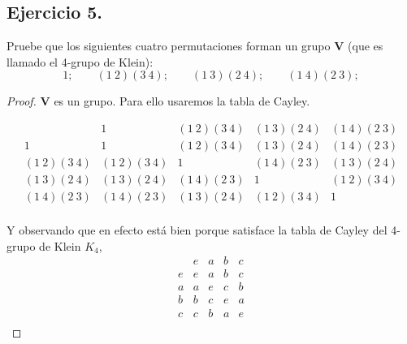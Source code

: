 \documentclass[11pt,letterpaper]{article}
\begin{document}
\subsection*{Ejercicio 5.}
Pruebe que los siguientes cuatro permutaciones forman un grupo $\mathbf{V}$ (que es llamado el 4-grupo de Klein):
\[
    1; \qquad (1\ 2)(3\ 4); \qquad (1\ 3)(2\ 4); \qquad (1\ 4)(2\ 3);
\]
\begin{proof}
    $\mathbf{V}$ es un grupo. Para ello usaremos la tabla de Cayley.
    
    \[
    \begin{array}{l|*{4}{l}}
                 & 1            & (1\ 2)(3\ 4) & (1\ 3)(2\ 4) & (1\ 4)(2\ 3)  \\
    \hline
    1            & 1            & (1\ 2)(3\ 4) & (1\ 3)(2\ 4) & (1\ 4)(2\ 3)  \\
    (1\ 2)(3\ 4) & (1\ 2)(3\ 4) & 1            & (1\ 4)(2\ 3) & (1\ 3)(2\ 4)  \\
    (1\ 3)(2\ 4) & (1\ 3)(2\ 4) & (1\ 4)(2\ 3)  & 1            & (1\ 2)(3\ 4) \\
    (1\ 4)(2\ 3) & (1\ 4)(2\ 3) & (1\ 3)(2\ 4) & (1\ 2)(3\ 4) & 1 \\
    \end{array} 
    \]

    Y observando que en efecto está bien porque satisface la tabla de Cayley del 4-grupo de Klein $K_4$,
    \[
        \begin{array}{l|*{4}{l}}
            & e & a & b & c \\
        \hline
        e   & e & a & b & c \\
        a   & a & e & c & b \\
        b   & b & c & e & a \\
        c   & c & b & a & e \\
        \end{array} 
        \]
\end{proof}





\end{document}
